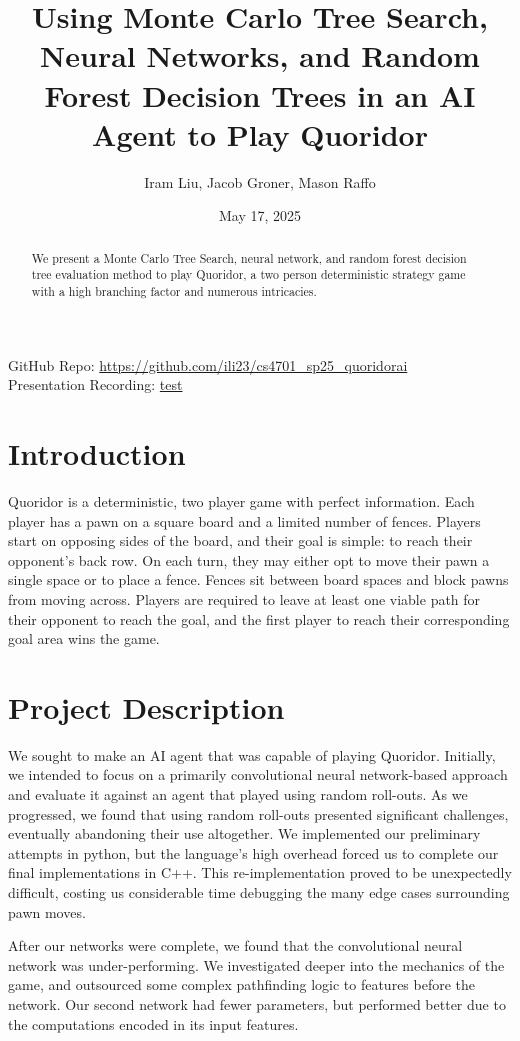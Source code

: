 \documentclass[10pt]{article}
\title{\bfseries Using Monte Carlo Tree Search, Neural Networks, and Random Forest Decision Trees in an AI Agent to Play Quoridor}
\author{
    Iram Liu, Jacob Groner, Mason Raffo
}
\date{May 17, 2025}
\newcommand{\githubLink}{\url{https://github.com/ili23/cs4701_sp25_quoridorai}}
\newcommand{\presentationLink}{\url{test}}
\begin{document}
\maketitle


\begin{abstract}We present a Monte Carlo Tree Search, neural network, and random forest decision tree evaluation method to play Quoridor, a two person deterministic strategy game with a high branching factor and numerous intricacies.
\end{abstract}
GitHub Repo: \githubLink \\
Presentation Recording: \presentationLink
\section{Introduction}
Quoridor is a deterministic, two player game with perfect information. Each player has a pawn on a square board and a limited number of fences. Players start on opposing sides of the board, and their goal is simple: to reach their opponent's back row. On each turn, they may either opt to move their pawn a single space or to place a fence. Fences sit between board spaces and block pawns from moving across. Players are required to leave at least one viable path for their opponent to reach the goal, and the first player to reach their corresponding goal area wins the game.

\section{Project Description}

We sought to make an AI agent that was capable of playing Quoridor. Initially, we intended to focus on a primarily convolutional neural network-based approach and evaluate it against an agent that played using random roll-outs. As we progressed, we found that using random roll-outs presented significant challenges, eventually abandoning their use altogether. We implemented our preliminary attempts in python, but the language's high overhead forced us to complete our final implementations in C++. This re-implementation proved to be unexpectedly difficult, costing us considerable time debugging the many edge cases surrounding pawn moves.

After our networks were complete, we found that the convolutional neural network was under-performing. We investigated deeper into the mechanics of the game, and outsourced some complex pathfinding logic to features before the network. Our second network had fewer parameters, but performed better due to the computations encoded in its input features.
\end{document}
